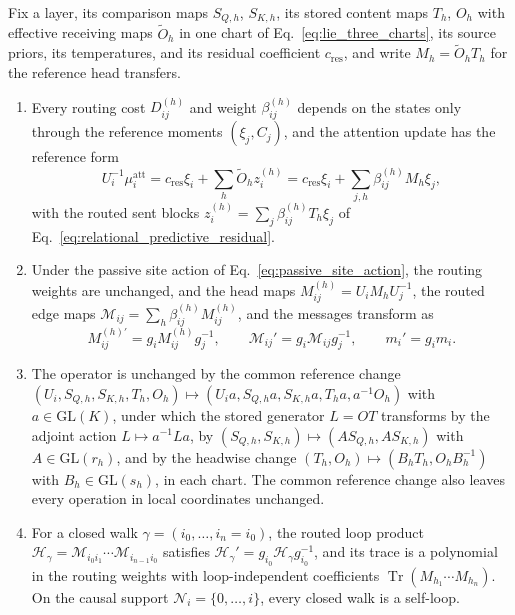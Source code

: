\documentclass[twoside,11pt]{article}
\begin{document}
\begin{theorem}
\label{thm:reference_moments}
Fix a layer, its comparison maps $S_{Q,h}$, $S_{K,h}$, its stored content maps $T_h$, $O_h$ with effective receiving maps $\widetilde O_h$ in one chart of Eq.~\eqref{eq:lie_three_charts}, its source priors, its temperatures, and its residual coefficient $c_{\mathrm{res}}$, and write $M_h=\widetilde O_hT_h$ for the reference head transfers.
\begin{enumerate}
\item Every routing cost $D_{ij}^{(h)}$ and weight $\beta_{ij}^{(h)}$ depends on the states only through the reference moments $(\xi_j,C_j)$, and the attention update has the reference form
\begin{equation}
U_i^{-1}\mu_i^{\mathrm{att}}=c_{\mathrm{res}}\xi_i+\sum_h\widetilde O_hz_i^{(h)}
=c_{\mathrm{res}}\xi_i+\sum_{j,h}\beta_{ij}^{(h)}M_h\xi_j,
\label{eq:projected_transformer_residual}
\end{equation}
with the routed sent blocks $z_i^{(h)}=\sum_j\beta_{ij}^{(h)}T_h\xi_j$ of Eq.~\eqref{eq:relational_predictive_residual}.
\item Under the passive site action of Eq.~\eqref{eq:passive_site_action}, the routing weights are unchanged, and the head maps $M_{ij}^{(h)}=U_iM_hU_j^{-1}$, the routed edge maps $\mathcal M_{ij}=\sum_h\beta_{ij}^{(h)}M_{ij}^{(h)}$, and the messages transform as
\begin{equation}
M_{ij}^{(h)\prime}=g_iM_{ij}^{(h)}g_j^{-1},
\qquad \mathcal M_{ij}'=g_i\mathcal M_{ij}g_j^{-1},
\qquad m_i'=g_i m_i.
\label{eq:relational_covariance}
\end{equation}
\item The operator is unchanged by the common reference change $(U_i,S_{Q,h},S_{K,h},T_h,O_h)\mapsto(U_ia,S_{Q,h}a,S_{K,h}a,T_ha,a^{-1}O_h)$ with $a\in\mathrm{GL}(K)$, under which the stored generator $L=OT$ transforms by the adjoint action $L\mapsto a^{-1}La$, by $(S_{Q,h},S_{K,h})\mapsto(AS_{Q,h},AS_{K,h})$ with $A\in\mathrm{GL}(r_h)$, and by the headwise change $(T_h,O_h)\mapsto(B_hT_h,O_hB_h^{-1})$ with $B_h\in\mathrm{GL}(s_h)$, in each chart. The common reference change also leaves every operation in local coordinates unchanged.
\item For a closed walk $\gamma=(i_0,\ldots,i_n=i_0)$, the routed loop product $\mathcal H_\gamma=\mathcal M_{i_0i_1}\cdots\mathcal M_{i_{n-1}i_0}$ satisfies $\mathcal H_\gamma'=g_{i_0}\mathcal H_\gamma g_{i_0}^{-1}$, and its trace is a polynomial in the routing weights with loop-independent coefficients $\operatorname{Tr}(M_{h_1}\cdots M_{h_n})$. On the causal support $\mathcal N_i=\{0,\ldots,i\}$, every closed walk is a self-loop.
\end{enumerate}
\end{theorem}
\end{document}
